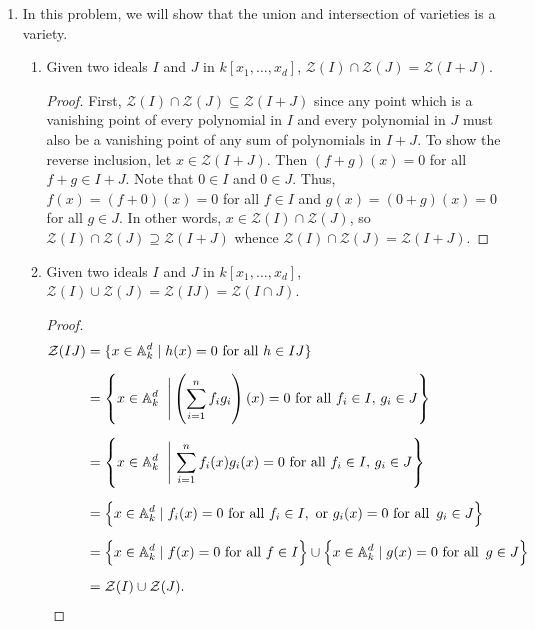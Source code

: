 \documentclass[11pt,oneside,english]{amsart}
\theoremstyle{definition}
\newcommand{\MC}[1]{\mathcal{#1}}
\newcommand{\MB}[1]{\mathbb{#1}}
\begin{document}
\begin{enumerate}[leftmargin=*]
\begin{enumerate}
\begin{proof}
Suppose $S \subseteq T\subseteq\MB{A}_k^n$. Let $f\in \MC{I}(T)$. Then $f(x)=0$ for all $x\in T$. Since $S\subseteq T$, $f(x)=0$ for all $x\in S$. Thus, $f\in \MC{I}(S)$, and so $\MC{I}(S) \supseteq \MC{I}(T)$.
\end{proof}
\end{enumerate}

\item  In this problem, we will show that the union and intersection of varieties is a variety.
\begin{enumerate}
\item Given two ideals $I$ and $J$ in $k[x_1, \ldots, x_d]$, $\MC{Z}(I) \cap \MC{Z}(J) = \MC{Z}(I + J)$.

\begin{proof}
First, $\MC{Z}(I) \cap \MC{Z}(J) \subseteq \MC{Z}(I + J)$ since any point which is a vanishing point of every polynomial in $I$ and every polynomial in $J$ must also be a vanishing point of any sum of polynomials in $I+J$. To show the reverse inclusion, let $x\in \MC{Z}(I + J)$. Then $(f+g)(x)=0$ for all $f+g\in I+J$. Note that $0\in I$ and $0\in J$. Thus, $f(x)=(f+0)(x)=0$ for all $f\in I$ and $g(x)=(0+g)(x)=0$ for all $g\in J$. In other words, $x\in\MC{Z}(I) \cap \MC{Z}(J)$, so $\MC{Z}(I) \cap \MC{Z}(J) \supseteq \MC{Z}(I + J)$ whence $\MC{Z}(I) \cap \MC{Z}(J) = \MC{Z}(I + J)$.
\end{proof}

\pagebreak

\item Given two ideals $I$ and $J$ in $k[x_1, \ldots, x_d]$, $\MC{Z}(I) \cup \MC{Z}(J) = \MC{Z}(IJ) = \MC{Z}(I \cap J)$.

\begin{proof}
\begin{align*}
\MC{Z}(IJ)&=\{x\in \MB{A}_k^d\mid h(x)=0\text{ for all }h\in IJ\}\\[2mm]
&=\left\{x\in \MB{A}_k^d\hspace{2mm}\Bigg| \left(\sum_{i=1}^nf_ig_i\right)(x)=0\text{ for all }f_i\in I,\,g_i\in J\right\}\\[2mm]
&=\left\{x\in \MB{A}_k^d\hspace{2mm}\Bigg|\, \sum_{i=1}^nf_i(x)g_i(x)=0\text{ for all }f_i\in I,\,g_i\in J\right\}\\[2mm]
&=\left\{x\in \MB{A}_k^d \mid f_i(x)=0\text{ for all }f_i\in I,\text{ or }g_i(x)=0\text{ for all }\,g_i\in J\right\}\\[2mm]
&=\left\{x\in \MB{A}_k^d \mid f(x)=0\text{ for all }f\in I\right\}\cup\left\{x\in \MB{A}_k^d \mid g(x)=0\text{ for all }\,g\in J\right\}\\[2mm]
&=\MC{Z}(I)\cup\MC{Z}(J).
\end{align*}


\end{proof}
\end{enumerate}
\end{enumerate}
\end{document}

